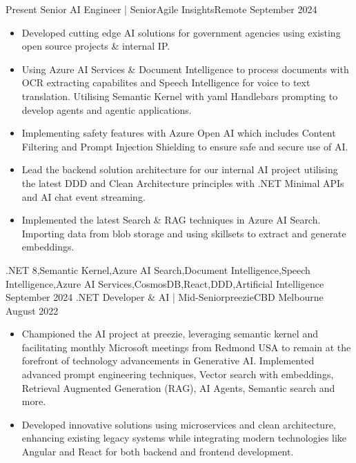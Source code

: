 
\begin{experiences}
  \experience
    {Present}   {Senior AI Engineer | Senior}{Agile Insights}{Remote}
    {September 2024} {
                      \begin{itemize}
					    \item Developed cutting edge AI solutions for government agencies using existing open source projects \& internal IP.
						\item Using Azure AI Services \& Document Intelligence to process documents with OCR extracting capabilites and Speech Intelligence for voice to text translation. Utilising Semantic Kernel with yaml Handlebars prompting to develop agents and agentic applications.
						\item Implementing safety features with Azure Open AI which includes Content Filtering and Prompt Injection Shielding to ensure safe and secure use of AI.
						\item Lead the backend solution architecture for our internal AI project utilising the latest DDD and Clean Architecture principles with .NET Minimal APIs and AI chat event streaming.
                        \item Implemented the latest Search \& RAG techniques in Azure AI Search. Importing data from blob storage and using skillsets to extract and generate embeddings.
                      \end{itemize}
                    }
                    {.NET 8,Semantic Kernel,Azure AI Search,Document Intelligence,Speech Intelligence,Azure AI Services,CosmosDB,React,DDD,Artificial Intelligence}
  \emptySeparator
  \experience
    {September 2024}   {.NET Developer \& AI | Mid-Senior}{preezie}{CBD Melbourne}
    {August 2022} {
                      \begin{itemize}
					    \item Championed the AI project at preezie, leveraging semantic kernel and facilitating monthly Microsoft meetings from Redmond USA to remain at the forefront of technology advancements in Generative AI. Implemented advanced prompt engineering techniques, Vector search with embeddings, Retrieval Augmented Generation (RAG), AI Agents, Semantic search and more.
                        \item Developed innovative solutions using microservices and clean architecture, enhancing existing legacy systems while integrating modern technologies like Angular and React for both backend and frontend development.       

\end{itemize}}
\end{experiences}
